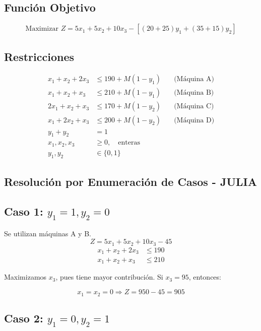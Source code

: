 \documentclass[12pt, a4paper, oneside]{book}
\theoremstyle{definition}
\begin{document}
    \subsection{Función Objetivo}

    \[
    \text{Maximizar } Z = 5x_1 + 5x_2 + 10x_3 - \left[ (20 + 25)y_1 + (35 + 15)y_2 \right]
    \]

    \subsection{Restricciones}

    \begin{align*}
    x_1 + x_2 + 2x_3 &\leq 190 + M(1 - y_1) \quad &\text{(Máquina A)} \\
    x_1 + x_2 + x_3 &\leq 210 + M(1 - y_1) \quad &\text{(Máquina B)} \\
    2x_1 + x_2 + x_3 &\leq 170 + M(1 - y_2) \quad &\text{(Máquina C)} \\
    x_1 + 2x_2 + x_3 &\leq 200 + M(1 - y_2) \quad &\text{(Máquina D)} \\
    y_1 + y_2 &= 1 \\
    x_1, x_2, x_3 &\geq 0,\quad \text{enteras} \\
    y_1, y_2 &\in \{0,1\}
    \end{align*}

    \subsection{Resolución por Enumeración de Casos - JULIA}

    \subsection{Caso 1: \(y_1 = 1, y_2 = 0\)}

    Se utilizan máquinas A y B.  
    \[
    Z = 5x_1 + 5x_2 + 10x_3 - 45
    \]
    \[
    \begin{aligned}
    x_1 + x_2 + 2x_3 &\leq 190 \\
    x_1 + x_2 + x_3 &\leq 210
    \end{aligned}
    \]

    Maximizamos \(x_3\), pues tiene mayor contribución. Si \(x_3 = 95\), entonces:

    \[
    x_1 = x_2 = 0 \Rightarrow Z = 950 - 45 = 905
    \]

    \subsection{Caso 2: \(y_1 = 0, y_2 = 1\)}
\end{document}
